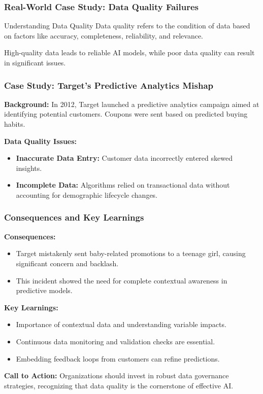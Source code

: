 \documentclass[aspectratio=169]{beamer}
\begin{document}
\begin{frame}[fragile]
    \frametitle{Real-World Case Study: Data Quality Failures}
    
    \begin{block}{Understanding Data Quality}
        Data quality refers to the condition of data based on factors like accuracy, completeness, reliability, and relevance.
    \end{block}
    
    High-quality data leads to reliable AI models, while poor data quality can result in significant issues.
\end{frame}

\begin{frame}[fragile]
    \frametitle{Case Study: Target’s Predictive Analytics Mishap}
    
    \textbf{Background:}
    In 2012, Target launched a predictive analytics campaign aimed at identifying potential customers. Coupons were sent based on predicted buying habits.
    
    \textbf{Data Quality Issues:}
    \begin{itemize}
        \item \textbf{Inaccurate Data Entry:} 
        Customer data incorrectly entered skewed insights.
        
        \item \textbf{Incomplete Data:} 
        Algorithms relied on transactional data without accounting for demographic lifecycle changes.
    \end{itemize}
\end{frame}

\begin{frame}[fragile]
    \frametitle{Consequences and Key Learnings}
    
    \textbf{Consequences:}
    \begin{itemize}
        \item Target mistakenly sent baby-related promotions to a teenage girl, causing significant concern and backlash.
        \item This incident showed the need for complete contextual awareness in predictive models.
    \end{itemize}
    
    \textbf{Key Learnings:}
    \begin{itemize}
        \item Importance of contextual data and understanding variable impacts.
        \item Continuous data monitoring and validation checks are essential.
        \item Embedding feedback loops from customers can refine predictions.
    \end{itemize}
    
    \textbf{Call to Action:} Organizations should invest in robust data governance strategies, recognizing that data quality is the cornerstone of effective AI.
\end{frame}
\end{document}
